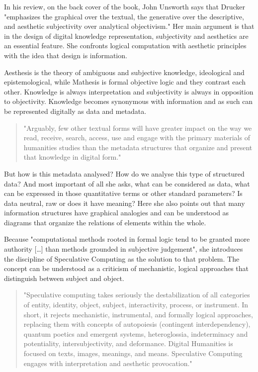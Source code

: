 In his review, on the back cover of the book, John Unsworth says that Drucker "emphasizes the graphical over the textual, the generative over the descriptive, and aesthetic subjectivity over analytical objectivism." Her main argument is that in the design of digital knowledge representation, subjectivity and aesthetics are an essential feature. She confronts logical computation with aesthetic principles with the idea that design is information.

Aesthesis is the theory of ambiguous and subjective knowledge, ideological and epistemological, while Mathesis is formal objective logic and they contrast each other. Knowledge is always interpretation and subjectivity is always in opposition to objectivity. Knowledge becomes synonymous with information and as such can be represented digitally as data and metadata.

\begin{quote}
  "Arguably, few other textual forms will have greater impact on the way we read, receive, search, access, use and engage with the primary materials of humanities studies than the metadata structures that organize and present that knowledge in digital form." \citep[p.9]{Drucker2009}
\end{quote}

But how is this metadata analysed? How do we analyse this type of structured data? And most important of all she asks, what can be considered as data, what can be expressed in those quantitative terms or other standard parameters? Is data neutral, raw or does it have meaning? Here she also points out that many information structures have graphical analogies and can be understood as diagrams that organize the relations of elements within the whole.

Because "computational methods rooted in formal logic tend to be granted more authority […] than methods grounded in subjective judgement", she introduces the discipline of Speculative Computing as the solution to that problem.  The concept can be understood as a criticism of mechanistic, logical approaches that distinguish between subject and object.

\begin{quote}
  "Speculative computing takes seriously the destabilization of all categories of entity, identity, object, subject, interactivity, process, or instrument. In short, it rejects mechanistic, instrumental, and formally logical approaches, replacing them with concepts of autopoiesis (contingent interdependency), quantum poetics and emergent systems, heteroglossia, indeterminacy and potentiality, intersubjectivity, and deformance. Digital Humanities is focused on texts, images, meanings, and means. Speculative Computing engages with interpretation and aesthetic provocation." \citep[p.29]{Drucker2009}
\end{quote}

